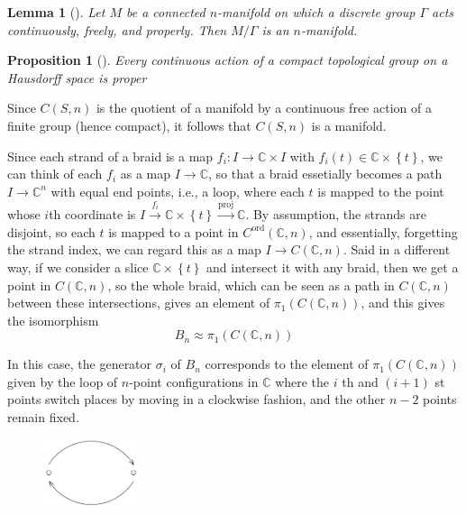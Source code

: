 \documentclass[reqno]{amsart}
\newtheorem{lemma}[theorem]{Lemma}
\newtheorem{proposition}[theorem]{Proposition}
\theoremstyle{definition}
\theoremstyle{remark}
\begin{document}
\begin{lemma}[]
    Let $M$ be a connected $n$-manifold on which a discrete
    group $\Gamma$ acts continuously, freely, and properly.
    Then $M / \Gamma $ is an $n$-manifold.
\end{lemma}

\begin{proposition}[]
    Every continuous action of a compact topological group
    on a Hausdorff space is proper
\end{proposition}


Since $C\left( S,n \right) $ is the quotient of a
manifold by a continuous free action of a finite group (hence
compact),
it follows that $C\left( S,n \right) $ is a manifold.

Since each strand of a braid is a map
$f_i \colon I \to \mathbb{C} \times I$ with
$f_i(t) \in \mathbb{C} \times \left\{ t \right\} $, we can
think of each $f_i$ as a map
$I \to \mathbb{C}$, so that
a braid essetially becomes a path
$I \to \mathbb{C}^{n}$ with equal end points, i.e., a loop, where
each $t$ is mapped to the point
whose $i$th coordinate is $I \stackrel{f_i}{\to} \mathbb{C} 
\times \left\{ t \right\} \stackrel{\text{proj}}{\to }
\mathbb{C}
$. By assumption, the strands are disjoint, so
each  $t$ is mapped to a point in
$C^{\text{ord}}\left( \mathbb{C},n \right) $,
and essentially, forgetting
the strand index, we can regard this as a map
$I \to C \left( \mathbb{C}, n \right) $. Said in a different
way, if we consider a slice $\mathbb{C} \times \left\{ t \right\} $
and intersect it with any braid, then we get a point
in $C \left( \mathbb{C},n \right) $, so the whole braid,
which can be seen as a path in $C \left( \mathbb{C},n \right) $ 
between these intersections, gives an element
of $\pi_1 \left( C \left( \mathbb{C},n \right)  \right) $, and
this
gives the isomorphism
\[
B_n \approx \pi_1 \left( C \left( \mathbb{C}, n \right)  \right) 
\] 

In this case, the generator 
$\sigma_i$ of $B_n$ corresponds to the element
of $\pi_1 \left( C \left( \mathbb{C},n \right)  \right) $ 
given by the loop of $n$-point configurations in
$\mathbb{C}$ where the $i$ th and $\left( i+1 \right) $ st
points switch places by moving in a clockwise fashion,
and the other $n-2$ points remain fixed.

\begin{figure}[htpb]
    \centering
    \includegraphics[width=0.25\textwidth]{sigma_i_configuration.png}
    \label{fig:sigma_i_configuration-png}
\end{figure}
\end{document}
